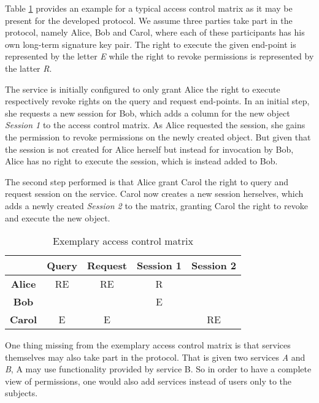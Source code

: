 Table \ref{tab:access-control-matrix} provides an example for a typical access control matrix as it may be present for the developed protocol.
We assume three parties take part in the protocol, namely Alice, Bob and Carol, where each of these participants has his own long-term signature key pair.
The right to execute the given end-point is represented by the letter \emph{E} while the right to revoke permissions is represented by the latter \emph{R}.

The service is initially configured to only grant Alice the right to execute respectively revoke rights on the query and request end-points.
In an initial step, she requests a new session for Bob, which adds a column for the new object \emph{Session 1} to the access control matrix.
As Alice requested the session, she gains the permission to revoke permissions on the newly created object.
But given that the session is not created for Alice herself but instead for invocation by Bob, Alice has no right to execute the session, which is instead added to Bob.

The second step performed is that Alice grant Carol the right to query and request session on the service.
Carol now creates a new session herselves, which adds a newly created \emph{Session 2} to the matrix, granting Carol the right to revoke and execute the new object.

\begin{table}
    \centering
    \begin{tabular}{|c|c|c|c|c|}
        \hline
              & \bfseries Query & \bfseries Request & \bfseries Session 1 & \bfseries Session 2\\
        \hline
        \bfseries Alice & RE    & RE      & R         &\\
        \hline
        \bfseries Bob   &       &         & E         &\\
        \hline
        \bfseries Carol & E     & E       &           & RE\\
        \hline
    \end{tabular}

    \caption{Exemplary access control matrix}
    \label{tab:access-control-matrix}
\end{table}

One thing missing from the exemplary access control matrix is that services themselves may also take part in the protocol.
That is given two services \emph{A} and \emph{B}, A may use functionality provided by service B.
So in order to have a complete view of permissions, one would also add services instead of users only to the subjects.

